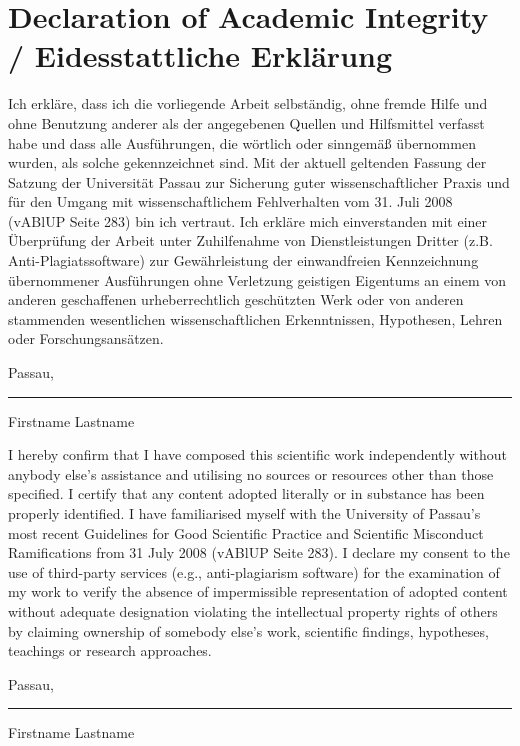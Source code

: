 
\chapter*{Declaration of Academic Integrity / Eidesstattliche Erkl\"arung}

Ich erkläre, dass ich die vorliegende Arbeit selbständig, ohne fremde Hilfe und ohne Benutzung anderer als der angegebenen Quellen und Hilfsmittel verfasst habe und dass alle Ausführungen, die wörtlich oder sinngemäß übernommen wurden, als solche gekennzeichnet sind. Mit der aktuell geltenden Fassung der Satzung der Universität Passau zur Sicherung guter wissenschaftlicher Praxis und für den Umgang mit wissenschaftlichem Fehlverhalten vom 31. Juli 2008 (vABlUP Seite 283) bin ich vertraut. Ich erkläre mich einverstanden mit einer Überprüfung der Arbeit unter Zuhilfenahme von Dienstleistungen Dritter (z.B. Anti-Plagiatssoftware) zur Gewährleistung der einwandfreien Kennzeichnung übernommener Ausführungen ohne Verletzung geistigen Eigentums an einem von anderen geschaffenen urheberrechtlich geschützten Werk oder von anderen stammenden wesentlichen wissenschaftlichen Erkenntnissen, Hypothesen, Lehren oder Forschungsansätzen.

\vspace{0.5cm}

	Passau, \fttoday

	\vspace{1.5cm}

	\parbox{5cm}{
	\hrule \strut Firstname Lastname}

	\vspace{1cm}


I hereby confirm that I have composed this scientific work independently without anybody else’s assistance and utilising no sources or resources other than those specified. I certify that any content adopted literally or in substance has been properly identified. I have familiarised myself with the University of Passau’s most recent Guidelines for Good Scientific Practice and Scientific Misconduct Ramifications from 31 July 2008 (vABlUP Seite 283). I declare my consent to the use of third-party services (e.g., anti-plagiarism software) for the examination of my work to verify the absence of impermissible representation of adopted content without adequate designation violating the intellectual property rights of others by claiming ownership of somebody else’s work, scientific findings, hypotheses, teachings or research approaches.


\vspace{0.5cm}

	Passau, \fttoday


	\vspace{1.5cm}

	\parbox{5cm}{
	\hrule \strut Firstname Lastname}



